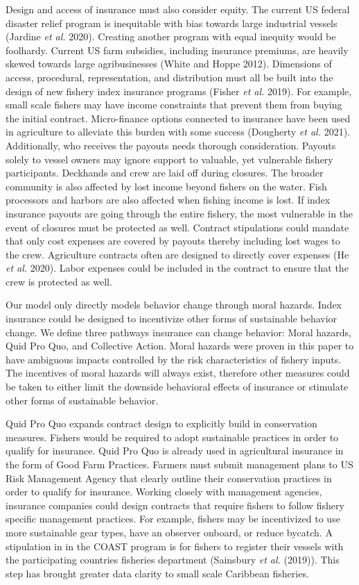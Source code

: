\documentclass[
  letterpaper,
  DIV=11,
  numbers=noendperiod]{scrartcl}
\theoremstyle{plain}
\theoremstyle{plain}
\theoremstyle{remark}
\begin{document}
Design and access of insurance must also consider equity. The current US
federal disaster relief program is inequitable with bias towards large
industrial vessels (Jardine \emph{et al.} 2020). Creating another
program with equal inequity would be foolhardy. Current US farm
subsidies, including insurance premiums, are heavily skewed towards
large agribusinesses (White and Hoppe 2012). Dimensions of access,
procedural, representation, and distribution must all be built into the
design of new fishery index insurance programs (Fisher \emph{et al.}
2019). For example, small scale fishers may have income constraints that
prevent them from buying the initial contract. Micro-finance options
connected to insurance have been used in agriculture to alleviate this
burden with some success (Dougherty \emph{et al.} 2021). Additionally,
who receives the payouts needs thorough consideration. Payouts solely to
vessel owners may ignore support to valuable, yet vulnerable fishery
participants. Deckhands and crew are laid off during closures. The
broader community is also affected by lost income beyond fishers on the
water. Fish processors and harbors are also affected when fishing income
is lost. If index insurance payouts are going through the entire
fishery, the most vulnerable in the event of closures must be protected
as well. Contract stipulations could mandate that only cost expenses are
covered by payouts thereby including lost wages to the crew. Agriculture
contracts often are designed to directly cover expenses (He \emph{et
al.} 2020). Labor expenses could be included in the contract to ensure
that the crew is protected as well.

Our model only directly models behavior change through moral hazards.
Index insurance could be designed to incentivize other forms of
sustainable behavior change. We define three pathways insurance can
change behavior: Moral hazards, Quid Pro Quo, and Collective Action.
Moral hazards were proven in this paper to have ambiguous impacts
controlled by the risk characteristics of fishery inputs. The incentives
of moral hazards will always exist, therefore other measures could be
taken to either limit the downside behavioral effects of insurance or
stimulate other forms of sustainable behavior.

Quid Pro Quo expands contract design to explicitly build in conservation
measures. Fishers would be required to adopt sustainable practices in
order to qualify for insurance. Quid Pro Quo is already used in
agricultural insurance in the form of Good Farm Practices. Farmers must
submit management plans to US Risk Management Agency that clearly
outline their conservation practices in order to qualify for insurance.
Working closely with management agencies, insurance companies could
design contracts that require fishers to follow fishery specific
management practices. For example, fishers may be incentivized to use
more sustainable gear types, have an observer onboard, or reduce
bycatch. A stipulation in in the COAST program is for fishers to
register their vessels with the participating countries fisheries
department (Sainsbury \emph{et al.} (2019)). This step has brought
greater data clarity to small scale Caribbean fisheries.
\end{document}
